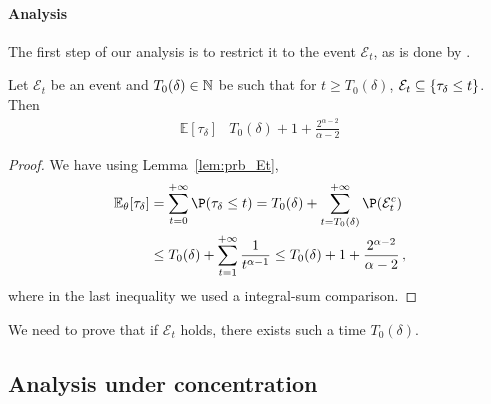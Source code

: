 \paragraph{Analysis} The first step of our analysis is to restrict it to the event $\mathcal E_t$, as is done by \citet{garivier2016tracknstop,degenne2019game}.
\begin{lemma}
Let $\mathcal E_t$ be an event and $T_0(\delta) \in {\mathbb N}$ be such that for $t\geq T_0(\delta)$, $\mathcal{E}_t \subseteq \{\tau_\delta \leq t\}$. Then
\begin{align*}
\mathbb{E}[\tau_\delta]
&T_0(\delta) + 1 + \frac{2^{\alpha-2}}{\alpha-2}
\end{align*}
\end{lemma}
\begin{proof}
We have using Lemma~\ref{lem:prb_Et},
\begin{align*}
\E_\theta[\tau_\delta] &= \sum_{t=0}^{+\infty} \P(\tau_\delta \leq t) = T_0(\delta) + \sum_{t=T_0(\delta)}^{+\infty} \P(\cE_t^c)\\
&\leq T_0(\delta) + \sum_{t=1}^{+\infty} \frac{1}{t^{\alpha-1}} \leq  T_0(\delta) + 1 + \frac{2^{\alpha-2}}{\alpha-2}\,,
\end{align*}
where in the last inequality we used a integral-sum comparison.
\end{proof}


We need to prove that if $\mathcal E_t$ holds, there exists such a time $T_0(\delta)$.


\subsection{Analysis under concentration}


